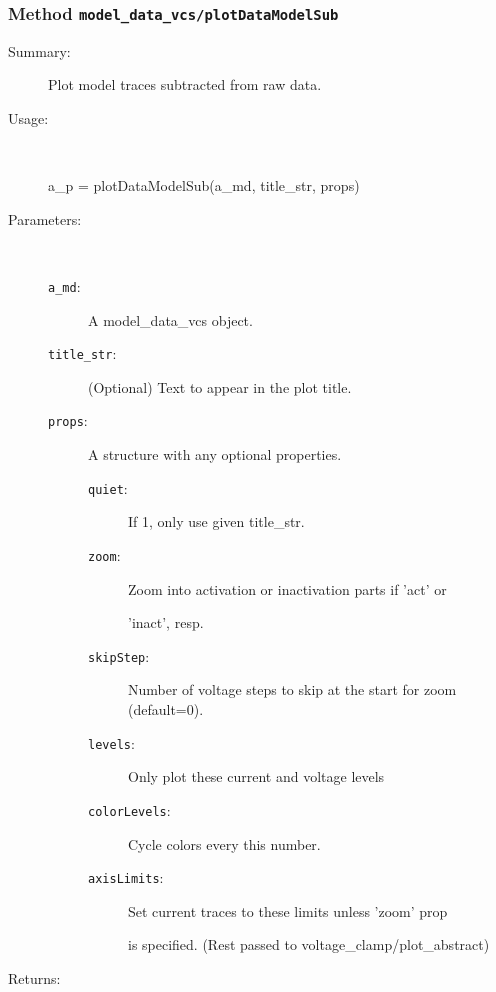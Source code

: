 \subsubsection[Method \texttt{plotDataModelSub}]{Method \texttt{model\_data\_vcs/plotDataModelSub}}%
%
\label{ref_model_data_vcs__plotDataModelSub}%
\hypertarget{ref_model_data_vcs__plotDataModelSub}{}%
\begin{description}
\item[Summary:]Plot model traces subtracted from raw data.
%
\item[Usage:]~%
\begin{lyxcode}%
a\_p = plotDataModelSub(a\_md, title\_str, props)
%
\end{lyxcode}%
%
%
\item[Parameters:]~
\begin{description}%
\item[\texttt{a\_md}:]
 A model\_data\_vcs object.
\item[\texttt{title\_str}:]
 (Optional) Text to appear in the plot title.
\item[\texttt{props}:]
 A structure with any optional properties.
\begin{description}%
\item[\texttt{quiet}:]
 If 1, only use given title\_str.
\item[\texttt{zoom}:]
 Zoom into activation or inactivation parts if 'act' or

'inact', resp.
\item[\texttt{skipStep}:]
 Number of voltage steps to skip at the start for zoom (default=0).
\item[\texttt{levels}:]
 Only plot these current and voltage levels
\item[\texttt{colorLevels}:]
 Cycle colors every this number.
\item[\texttt{axisLimits}:]
 Set current traces to these limits unless 'zoom' prop

is specified.
(Rest passed to voltage\_clamp/plot\_abstract)
\end{description}%
\end{description}%
%
\item[Returns:
]~


\end{description}
